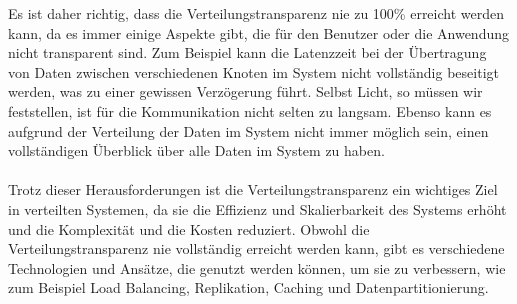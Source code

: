 \documentclass[../vs-script-first-v01.tex]{subfiles}
\begin{document}
Es ist daher richtig, dass die Verteilungstransparenz nie zu 100\% erreicht werden kann, da es immer einige Aspekte gibt, die für den Benutzer oder die Anwendung nicht transparent sind. Zum Beispiel kann die Latenzzeit bei der Übertragung von Daten zwischen verschiedenen Knoten im System nicht vollständig beseitigt werden, was zu einer gewissen Verzögerung führt.  Selbst Licht, so müssen wir feststellen, ist für die Kommunikation nicht selten zu langsam. Ebenso kann es aufgrund der Verteilung der Daten im System nicht immer möglich sein, einen vollständigen Überblick über alle Daten im System zu haben.
\\\\
Trotz dieser Herausforderungen ist die Verteilungstransparenz ein wichtiges Ziel in verteilten Systemen, da sie die Effizienz und Skalierbarkeit des Systems erhöht und die Komplexität und die Kosten reduziert. Obwohl die Verteilungstransparenz nie vollständig erreicht werden kann, gibt es verschiedene Technologien und Ansätze, die genutzt werden können, um sie zu verbessern, wie zum Beispiel Load Balancing, Replikation, Caching und Datenpartitionierung.
\end{document}
